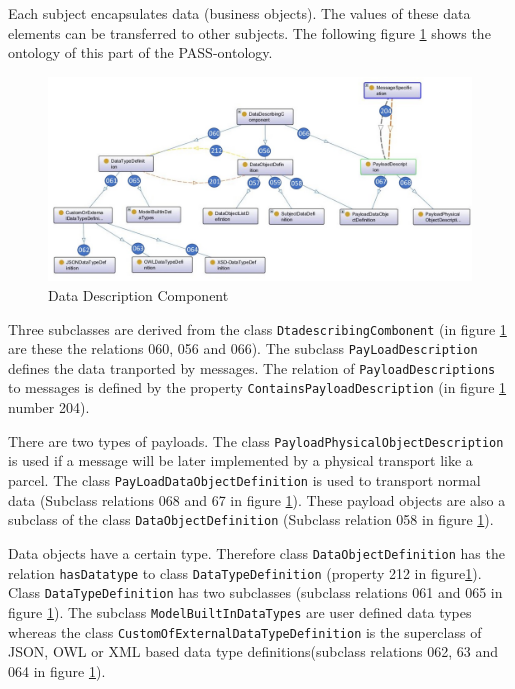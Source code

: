 Each subject encapsulates data (business objects). The values of these data elements can be transferred to other subjects. The following figure \ref{fig:20181218-data} shows the ontology of this part of the PASS-ontology.

\begin{figure}[htbp]
	\centering
	\includegraphics[width=0.9\linewidth]{20181026-Ontologie-Bilder/Grafiken-Ontologie/SUbject-Interaction/20181218-Data}
	\caption[Data Description Component]{Data Description Component}
	\label{fig:20181218-data}
\end{figure}

Three subclasses are derived from the class \texttt{DtadescribingCombonent} (in figure \ref{fig:20181218-data} are these the relations 060, 056 and 066). The subclass \texttt{PayLoadDescription} defines the data tranported by messages. The relation of \texttt{PayloadDescriptions} to messages is defined by the property \texttt{ContainsPayloadDescription} (in figure \ref{fig:20181218-data} number 204).

There are two types of payloads. The class \texttt{PayloadPhysicalObjectDescription} is used if a message will be later implemented by a physical transport like a parcel. The class \texttt{PayLoadDataObjectDefinition} is used to transport normal data (Subclass relations 068 and 67 in figure \ref{fig:20181218-data}). These payload objects are also a subclass of the class \texttt{DataObjectDefinition} (Subclass relation 058 in figure \ref{fig:20181218-data}).

Data objects have a certain type. Therefore class \texttt{DataObjectDefinition} has the relation \texttt{hasDatatype} to class \texttt{DataTypeDefinition} (property 212 in figure\ref{fig:20181218-data}). Class \texttt{DataTypeDefinition} has two subclasses (subclass relations 061 and 065 in figure \ref{fig:20181218-data}). The subclass \texttt{ModelBuiltInDataTypes} are user defined data types whereas the class \texttt{CustomOfExternalDataTypeDefinition} is the superclass of JSON, OWL or XML based data type definitions(subclass relations 062, 63 and 064 in figure \ref{fig:20181218-data}).

